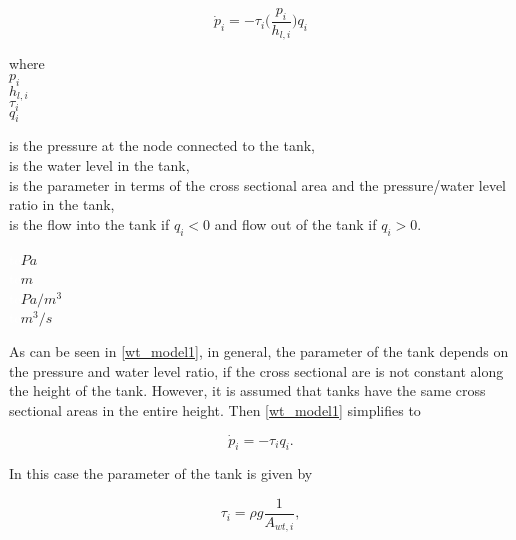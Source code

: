 \begin{equation}
\label{wt_model1}
\dot{p}_i = -\tau_i\Big(\frac{p_i}{h_{l,i}}\Big) q_i
\end{equation}

 \begin{minipage}[t]{0.20\textwidth}
where\\
\hspace*{8mm} $p_i$ \\
\hspace*{8mm} $h_{l,i}$ \\
\hspace*{8mm} $\tau_i$ \\
\newline
\hspace*{8mm} $q_i$ 
\end{minipage}
\begin{minipage}[t]{0.63\textwidth}
\vspace*{2mm}
is the pressure at the node connected to the tank,\\ 
is the water level in the tank,\\ 
is the parameter in terms of the cross sectional area and the pressure/water level ratio in the tank,\\
is the flow into the tank if $q_i < 0$ and flow out of the tank if $q_i > 0$.
\end{minipage}
\begin{minipage}[t]{0.15\textwidth}
\vspace*{2mm}
\textcolor{White}{te}$\unit{Pa}$\\
\textcolor{White}{te}$\unit{m}$\\
\textcolor{White}{te}$\unit{Pa/m^3}$\\
\textcolor{White}{te}$\unit{m^3/s}$
\end{minipage} 

As can be seen in \eqref{wt_model1}, in general, the parameter of the tank depends on the pressure and water level ratio, if the cross sectional are is not constant along the height of the tank. However, it is assumed that tanks have the same cross sectional areas in the entire height. Then \eqref{wt_model1} simplifies to

\begin{equation}
\label{wt_model2}
\dot{p}_i = -\tau_i q_i.
\end{equation}

In this case the parameter of the tank is given by 

\begin{equation}
\label{wt_model3}
\tau_i = \rho g \frac{1}{A_{wt,i}},
\end{equation}

